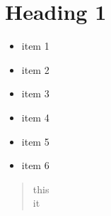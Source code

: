 \documentclass{article}
\begin{document}
 
\setcounter{secnumdepth}{0}

    
\section{Heading 1}
\begin{itemize}
    \item item 1
    \item item 2
    \item item 3
\end{itemize}

\begin{itemize}
    \item item 4
    \item item 5
    \item item 6
\end{itemize}

\begin{quote}
this\\
it
\end{quote}
\end{document}
